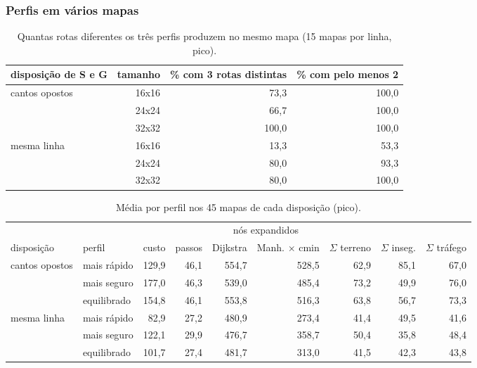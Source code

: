 \documentclass[11pt,a4paper]{article}
\begin{document}
\subsubsection*{Perfis em vários mapas}

\begin{table}[H]
  \centering
  \small
  \caption{Quantas rotas diferentes os três perfis produzem no mesmo mapa (15 mapas por linha, pico).}
  \label{tab:divergencia}
  \begin{tabular}{lrrr}
    \toprule
    disposição de S e G & tamanho & \% com 3 rotas distintas & \% com pelo menos 2 \\
    \midrule
    cantos opostos & 16x16 &  73,3 & 100,0 \\
                   & 24x24 &  66,7 & 100,0 \\
                   & 32x32 & 100,0 & 100,0 \\
    mesma linha    & 16x16 &  13,3 &  53,3 \\
                   & 24x24 &  80,0 &  93,3 \\
                   & 32x32 &  80,0 & 100,0 \\
    \bottomrule
  \end{tabular}
\end{table}

\begin{table}[H]
  \centering
  \footnotesize
  \setlength{\tabcolsep}{4pt}
  \caption{Média por perfil nos 45 mapas de cada disposição (pico).}
  \label{tab:perfis_mapas}
  \begin{tabular}{llrrrrrrr}
    \toprule
    & & & & \multicolumn{2}{c}{nós expandidos} & & & \\
    \cmidrule(lr){5-6}
    disposição & perfil & custo & passos & Dijkstra & Manh. $\times$ cmin & $\Sigma$ terreno & $\Sigma$ inseg. & $\Sigma$ tráfego \\
    \midrule
    cantos opostos & mais rápido & 129,9 & 46,1 & 554,7 & 528,5 & 62,9 & 85,1 & 67,0 \\
                   & mais seguro & 177,0 & 46,3 & 539,0 & 485,4 & 73,2 & 49,9 & 76,0 \\
                   & equilibrado & 154,8 & 46,1 & 553,8 & 516,3 & 63,8 & 56,7 & 73,3 \\
    mesma linha    & mais rápido &  82,9 & 27,2 & 480,9 & 273,4 & 41,4 & 49,5 & 41,6 \\
                   & mais seguro & 122,1 & 29,9 & 476,7 & 358,7 & 50,4 & 35,8 & 48,4 \\
                   & equilibrado & 101,7 & 27,4 & 481,7 & 313,0 & 41,5 & 42,3 & 43,8 \\
    \bottomrule
  \end{tabular}
\end{table}
\end{document}
